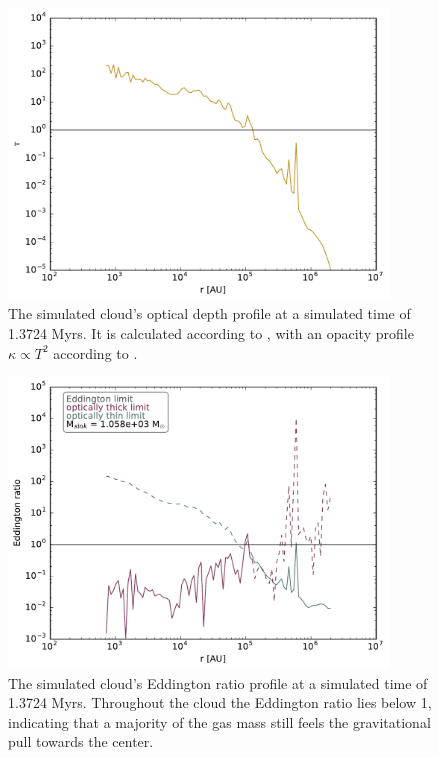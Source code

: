 \FloatBarrier

\begin{figure}[!htb]
 \centering
 \includegraphics[width=0.9\textwidth]{Figures/cloud_profiles/tau_profile}
 \captionsetup{justification=justified,singlelinecheck=false,width=\linewidth}
 \decoRule
 \caption[Cloud's optical depth profile]{The simulated cloud's optical depth profile at a simulated time of 1.3724 Myrs.
                                         It is calculated according to , with an opacity profile $\kappa\propto T^{2}$ according to \citet{Davisetal}.}
 \label{fig:Cloud_tau}
\end{figure}

\FloatBarrier

\begin{figure}[!htb]
 \centering
 \includegraphics[width=0.9\textwidth]{Figures/cloud_profiles/eddington_limits}
 \captionsetup{justification=justified,singlelinecheck=false,width=\linewidth}
 \decoRule
 \caption[Cloud's Eddington ratio profile]{The simulated cloud's Eddington ratio profile at a simulated time of 1.3724 Myrs.
                                           Throughout the cloud the Eddington ratio lies below 1, indicating that a majority of the gas mass still feels the gravitational pull towards the center.}
 \label{fig:Cloud_eddington}
\end{figure}
\FloatBarrier


